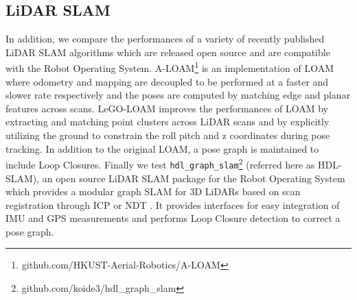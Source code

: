 \documentclass[conference]{IEEEtran}  %
\begin{document}
\subsection{LiDAR SLAM}
In addition, we compare the performances of a variety of recently published LiDAR SLAM algorithms which are released open source and are compatible with the Robot Operating System. A-LOAM\footnote{github.com/HKUST-Aerial-Robotics/A-LOAM} is an implementation of LOAM \cite{Method::LOAM} where odometry and mapping are decoupled to be performed at a faster and slower rate respectively and the poses are computed by matching edge and planar features across scans. LeGO-LOAM \cite{legoloam2018} improves the performances of LOAM by extracting and matching point clusters across LiDAR scans and by explicitly utilizing the ground to constrain the roll pitch and z coordinates during pose tracking. In addition to the original LOAM, a pose graph is maintained to include Loop Closures. Finally we test \texttt{hdl\_graph\_slam}\footnote{github.com/koide3/hdl\_graph\_slam} \cite{koide2018portable} (referred here as HDL-SLAM), an open source LiDAR SLAM package for the Robot Operating System which provides a modular graph SLAM for 3D LiDARs based on scan registration through ICP or NDT \cite{NDT}. It provides interfaces for easy integration of IMU and GPS measurements and performs Loop Closure detection to correct a pose graph.
\end{document}
